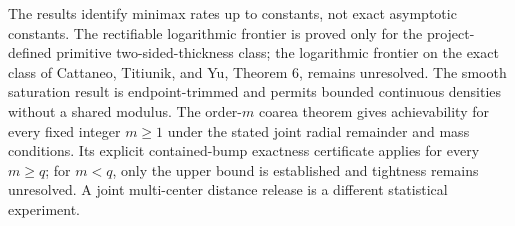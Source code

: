 The results identify minimax rates up to constants, not exact asymptotic constants.  The rectifiable logarithmic frontier is proved only for the project-defined primitive two-sided-thickness class; the logarithmic frontier on the exact class of Cattaneo, Titiunik, and Yu, Theorem 6, remains unresolved.  The smooth saturation result is endpoint-trimmed and permits bounded continuous densities without a shared modulus.  The order-\(m\) coarea theorem gives achievability for every fixed integer \(m\geq1\) under the stated joint radial remainder and mass conditions.  Its explicit contained-bump exactness certificate applies for every \(m\geq q\); for \(m<q\), only the upper bound is established and tightness remains unresolved.  A joint multi-center distance release is a different statistical experiment.